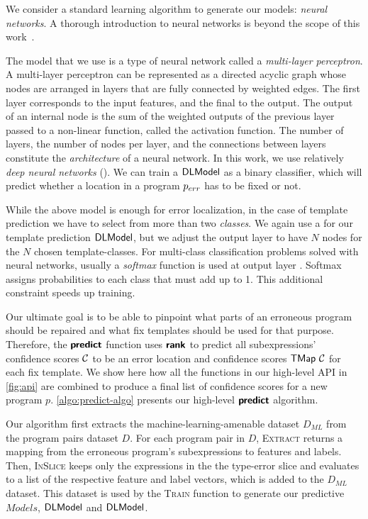 We consider a standard learning algorithm to generate our models: \emph{neural
networks}. A thorough introduction to neural networks is
beyond the scope of this work~\citep{Hastie2009-bn,Nielsen2015-pu}.

The model that we use is a type of neural network called a \emph{multi-layer
perceptron}. A multi-layer perceptron can be represented as a directed acyclic
graph whose nodes are arranged in layers that are fully connected by weighted
edges. The first layer corresponds to the input features, and the final to the
output. The output of an internal node is the sum of the weighted
outputs of the previous layer passed to a non-linear function, called the
activation function. The number of layers,
the number of nodes per layer, and the connections between layers constitute the
\emph{architecture} of a neural network. In this work, we use relatively
\emph{deep neural networks} (\dnn). We can train a \dnn $\mathsf{DLModel}$ as a
binary classifier, which will predict whether a location in a program $p_{err}$
has to be fixed or not.

While the above model is enough for error localization, in the case of template
prediction we have to select from more than two \emph{classes}. We again use a
\dnn for our template prediction $\mathsf{DLModel}$, but we adjust the output layer to
have $N$ nodes for the $N$ chosen template-classes. For multi-class
classification problems solved with neural networks, usually a \emph{softmax}
function is used at output layer \citep{Goodfellow-et-al-2016,Bishop-book-2006}.
Softmax assigns probabilities to each class that must add up to 1.
This additional constraint speeds up training.



Our ultimate goal is to be able to pinpoint what parts of an erroneous program
should be repaired and what fix templates should be used for that purpose.
Therefore, the $\bm{\mathsf{predict}}$ function uses $\bm{\mathsf{rank}}$ to predict all
subexpressions' confidence scores $\mathcal{C}$ to be an error location and confidence
scores $\mathsf{TMap}\ \mathcal{C}$ for each fix template. We show here how all the functions
in our high-level API in \autoref{fig:api} are combined to produce a final list
of confidence scores for a new program $p$. \autoref{algo:predict-algo} presents
our high-level $\bm{\mathsf{predict}}$ algorithm.

Our algorithm first extracts the machine-learning-amenable dataset $D_{ML}$
from the program pairs dataset $D$. For each program pair in $D$,
\textsc{Extract} returns a mapping from the erroneous program's subexpressions
to features and labels. Then, \textsc{InSlice} keeps only the expressions in
the the type-error slice and evaluates to a list of the respective feature and
label vectors, which is added to the $D_{ML}$ dataset. This dataset
is used by the \textsc{Train} function to generate our predictive $Models$, \ie
$\mathsf{DLModel}$ and $\mathsf{DLModel}$.

